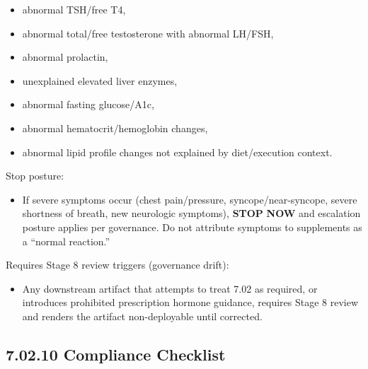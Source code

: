 \documentclass[10pt]{article}
\begin{document}
\begin{itemize}
  \begin{itemize}
  \item abnormal TSH/free T4,
  \item abnormal total/free testosterone with abnormal LH/FSH,
  \item abnormal prolactin,
  \item unexplained elevated liver enzymes,
  \item abnormal fasting glucose/A1c,
  \item abnormal hematocrit/hemoglobin changes,
  \item abnormal lipid profile changes not explained by diet/execution context.
  \end{itemize}
\end{itemize}

Stop posture:

\begin{itemize}
\item If severe symptoms occur (chest pain/pressure, syncope/near-syncope, severe shortness of breath, new neurologic symptoms), \textbf{STOP} \textbf{NOW} and escalation posture applies per governance. Do not attribute symptoms to supplements as a “normal reaction.”
\end{itemize}

Requires Stage 8 review triggers (governance drift):

\begin{itemize}
\item Any downstream artifact that attempts to treat 7.02 as required, or introduces prohibited prescription hormone guidance, requires Stage 8 review and renders the artifact non-deployable until corrected.
\end{itemize}

\subsection*{7.02.10 Compliance Checklist}
{}
\end{document}
